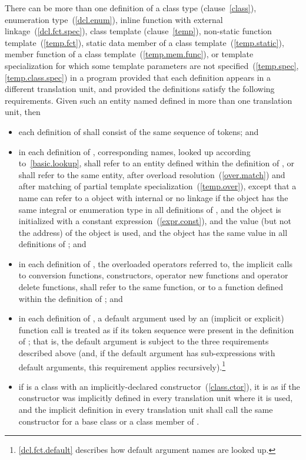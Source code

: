 \pnum
There can be more than one definition of a class type
(clause~\ref{class}), enumeration type~(\ref{dcl.enum}), inline function
with external linkage~(\ref{dcl.fct.spec}), class template
(clause~\ref{temp}), non-static function template~(\ref{temp.fct}),
static data member of a class template~(\ref{temp.static}), member
function of a class template~(\ref{temp.mem.func}), or template
specialization for which some template parameters are not
specified~(\ref{temp.spec}, \ref{temp.class.spec}) in a program provided
that each definition appears in a different translation unit, and
provided the definitions satisfy the following requirements. Given such
an entity named  defined in more than one translation unit,
then
\begin{itemize}
\item each definition of  shall consist of the same sequence of
tokens; and
\item in each definition of , corresponding names, looked up
according to~\ref{basic.lookup}, shall refer to an entity defined within
the definition of , or shall refer to the same entity, after
overload resolution~(\ref{over.match}) and after matching of partial
template specialization~(\ref{temp.over}), except that a name can refer
to a  object with internal or no linkage if the object has
the same integral or enumeration type in all definitions of ,
and the object is initialized with a constant
expression~(\ref{expr.const}), and the value (but not the address) of
the object is used, and the object has the same value in all definitions
of ; and
\item in each definition of , the overloaded operators referred
to, the implicit calls to conversion functions, constructors, operator
new functions and operator delete functions, shall refer to the same
function, or to a function defined within the definition of ;
and
\item in each definition of , a default argument used by an
(implicit or explicit) function call is treated as if its token sequence
were present in the definition of ; that is, the default
argument is subject to the three requirements described above (and, if
the default argument has sub-expressions with default arguments, this
requirement applies recursively).\footnote{\ref{dcl.fct.default} 
describes how default argument names are looked up.}
\item if  is a class with an implicitly-declared
constructor~(\ref{class.ctor}), it is as if the constructor was
implicitly defined in every translation unit where it is used, and the
implicit definition in every translation unit shall call the same
constructor for a base class or a class member of .
\enterexample


\end{itemize}
